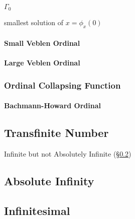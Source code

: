 $\Gamma_0$

smallest solution of $x = \phi_x(0)$



\paragraph{Small Veblen Ordinal}\label{sec:small_veblen}\hfill

\paragraph{Large Veblen Ordinal}\label{sec:large_veblen}\hfill



\subsubsection{Ordinal Collapsing Function}
\label{sec:ordinal_collapsing}

\paragraph{Bachmann-Howard Ordinal}\label{sec:bachmann_howard}



\subsection{Transfinite Number}\label{sec:transfinite_number}

Infinite but not Absolutely Infinite (\S\ref{sec:absolute_infinity})



\subsection{Absolute Infinity}\label{sec:absolute_infinity}

\subsection{Infinitesimal}\label{sec:infinitesimal}

